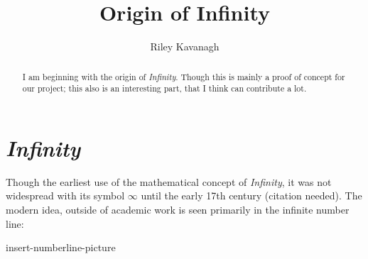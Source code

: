 \documentclass[]{article}
\title{Origin of Infinity}
\author{Riley Kavanagh}
\date{}
\begin{document}
\maketitle

\begin{abstract}
I am beginning with the origin of \textit{Infinity}. Though this is mainly a proof of concept for our project; this also is an interesting part, that I think can contribute a lot.

\end{abstract}

\section{\textit{Infinity}}
Though the earliest use of the mathematical concept of \textit{Infinity}, it was not widespread with its symbol $\infty$ until the early 17th century (citation needed). The modern idea, outside of academic work is seen primarily in the infinite number line:

insert-numberline-picture
\end{document}
